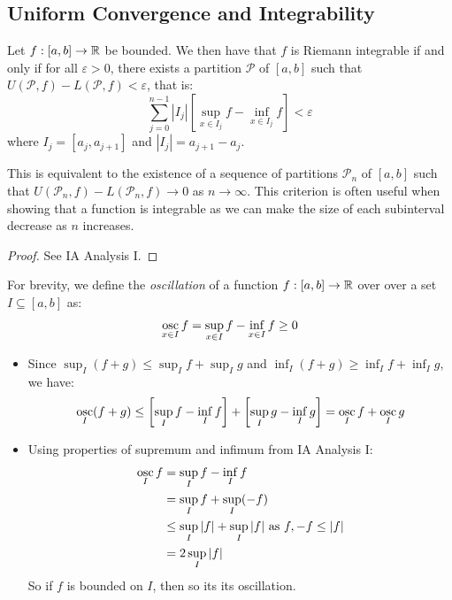 \documentclass[../main.tex]{subfiles}
\begin{document}
\subsection{Uniform Convergence and Integrability}
\begin{theorem}
  Let $f: [a, b] \to \mathbb{R}$ be bounded.
  We then have that $f$ is Riemann integrable if and only if for all $\varepsilon > 0$, there exists a partition $\mathcal{P}$ of $[a, b]$ such that $U(\mathcal{P}, f) - L(\mathcal{P}, f) < \varepsilon$, that is: \label{intCritereon}
  \[
    \sum_{j = 0}^{n - 1} |I_j| \left[\sup_{x \in I_j} f - \inf_{x \in I_j} f\right] < \varepsilon
  \]
  where $I_j = [a_j, a_{j + 1}]$ and $|I_j| = a_{j + 1} - a_j$.
\end{theorem}
\begin{remark}
  This is equivalent to the existence of a sequence of partitions $\mathcal{P}_n$ of $[a, b]$ such that $U(\mathcal{P}_n, f) - L(\mathcal{P}_n, f) \to 0$ as $n \to \infty$.
  This criterion is often useful when showing that a function is integrable as we can make the size of each subinterval decrease as $n$ increases.
\end{remark}
\begin{proof}
  See IA Analysis I.
\end{proof}
\begin{remark}[Notation]
  For brevity, we define the \textit{oscillation} of a function $f: [a, b] \to \mathbb{R}$ over over a set $I \subseteq [a, b]$ as:
  \[
    \operatorname*{osc}_{x \in I} f = \sup_{x \in I} f - \inf_{x \in I} f \geq 0
  \]
\end{remark}
\begin{remark}
  \begin{itemize}
    \item Since $\sup_{I} (f + g) \leq \sup_{I} f + \sup_{I} g$ and $\inf_{I} (f + g) \geq \inf_{I} f + \inf_{I} g$, we have:
      \[
        \operatorname*{osc}_{I} (f + g) \leq \left[\sup_{I} f - \inf_{I} f\right] + \left[\sup_{I} g - \inf_{I} g\right] = \operatorname*{osc}_{I} f + \operatorname*{osc}_{I} g
      \]
    \item Using properties of supremum and infimum from IA Analysis I:
      \begin{align*}
        \operatorname*{osc}_{I} f &= \sup_I f - \inf_I f \\
                   &= \sup_I f + \sup_I (-f) \\
                   &\leq \sup_I |f| + \sup_I |f| \text{ as $f, -f \leq |f|$} \\
                   &= 2 \sup_I |f|
      \end{align*}
      So if $f$ is bounded on $I$, then so its its oscillation.
  \end{itemize}
\end{remark}
\end{document}

